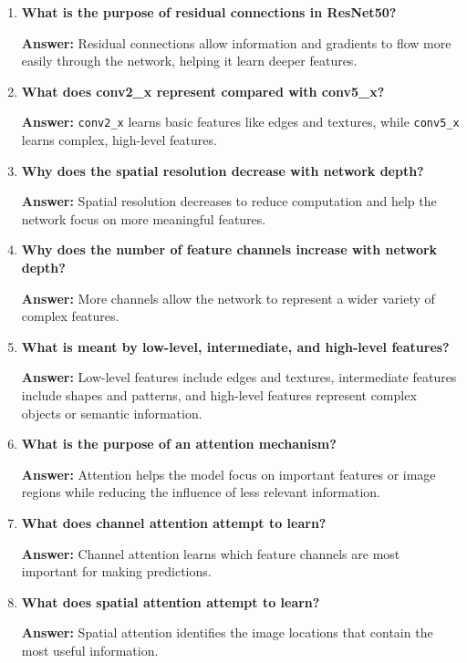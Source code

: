 \documentclass[10pt]{article}
\begin{document}
\begin{enumerate}

\item \textbf{What is the purpose of residual connections in ResNet50?}

\textbf{Answer:} Residual connections allow information and gradients to flow more easily through the network, helping it learn deeper features.

\item \textbf{What does conv2\_x represent compared with conv5\_x?}

\textbf{Answer:} \texttt{conv2\_x} learns basic features like edges and textures, while \texttt{conv5\_x} learns complex, high-level features.

\item \textbf{Why does the spatial resolution decrease with network depth?}

\textbf{Answer:} Spatial resolution decreases to reduce computation and help the network focus on more meaningful features.

\item \textbf{Why does the number of feature channels increase with network depth?}

\textbf{Answer:} More channels allow the network to represent a wider variety of complex features.

\item \textbf{What is meant by low-level, intermediate, and high-level features?}

\textbf{Answer:} Low-level features include edges and textures, intermediate features include shapes and patterns, and high-level features represent complex objects or semantic information.

\item \textbf{What is the purpose of an attention mechanism?}

\textbf{Answer:} Attention helps the model focus on important features or image regions while reducing the influence of less relevant information.

\item \textbf{What does channel attention attempt to learn?}

\textbf{Answer:} Channel attention learns which feature channels are most important for making predictions.

\item \textbf{What does spatial attention attempt to learn?}

\textbf{Answer:} Spatial attention identifies the image locations that contain the most useful information.


\end{enumerate}
\end{document}
